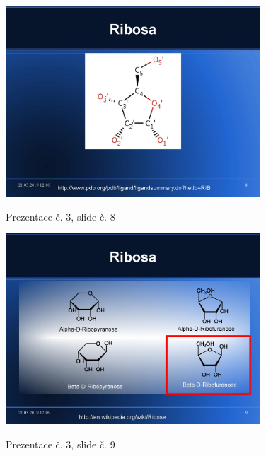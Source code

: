 \documentclass[DIV=8]{scrreprt}
\begin{document}
\begin{figure}
    \caption{Prezentace č. 3, slide č. 8}
    \includegraphics[width=0.85\textwidth]{slides-3/slide-8.jpg}
    \centering
    \label{slides-3-slide-8}
\end{figure}
\begin{figure}
    \caption{Prezentace č. 3, slide č. 9}
    \includegraphics[width=0.85\textwidth]{slides-3/slide-9.jpg}
    \centering
    \label{slides-3-slide-9}
\end{figure}
\end{document}
